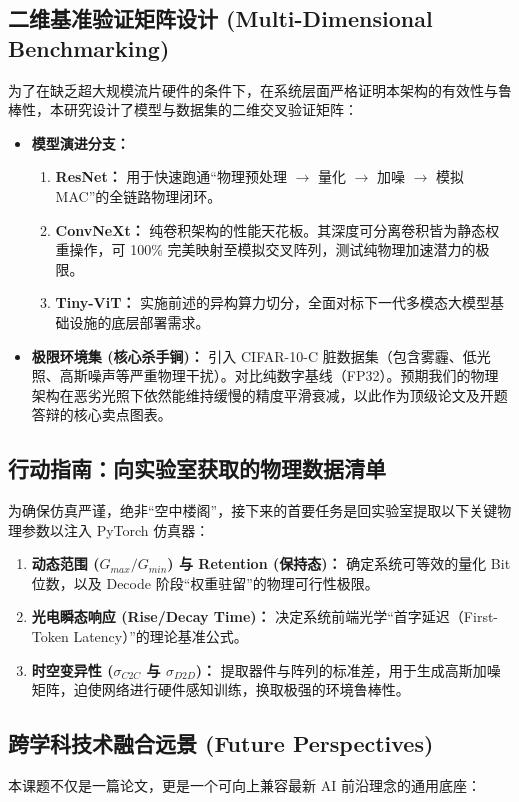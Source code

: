 \documentclass[12pt, a4paper]{ctexart}
\begin{document}
\subsection{二维基准验证矩阵设计 (Multi-Dimensional Benchmarking)}
为了在缺乏超大规模流片硬件的条件下，在系统层面严格证明本架构的有效性与鲁棒性，本研究设计了模型与数据集的二维交叉验证矩阵：

\begin{itemize}
    \item \textbf{模型演进分支：} 
    \begin{enumerate}
        \item \textbf{ResNet：} 用于快速跑通“物理预处理 $\rightarrow$ 量化 $\rightarrow$ 加噪 $\rightarrow$ 模拟 MAC”的全链路物理闭环。
        \item \textbf{ConvNeXt：} 纯卷积架构的性能天花板。其深度可分离卷积皆为静态权重操作，可 100\% 完美映射至模拟交叉阵列，测试纯物理加速潜力的极限。
        \item \textbf{Tiny-ViT：} 实施前述的异构算力切分，全面对标下一代多模态大模型基础设施的底层部署需求。
    \end{enumerate}
    \item \textbf{极限环境集 (核心杀手锏)：} 
    引入 CIFAR-10-C 脏数据集（包含雾霾、低光照、高斯噪声等严重物理干扰）。对比纯数字基线（FP32）。预期我们的物理架构在恶劣光照下依然能维持缓慢的精度平滑衰减，以此作为顶级论文及开题答辩的核心卖点图表。
\end{itemize}

\subsection{行动指南：向实验室获取的物理数据清单}
为确保仿真严谨，绝非“空中楼阁”，接下来的首要任务是回实验室提取以下关键物理参数以注入 PyTorch 仿真器：
\begin{enumerate}
    \item \textbf{动态范围 ($G_{max}/G_{min}$) 与 Retention (保持态)：} 确定系统可等效的量化 Bit 位数，以及 Decode 阶段“权重驻留”的物理可行性极限。
    \item \textbf{光电瞬态响应 (Rise/Decay Time)：} 决定系统前端光学“首字延迟（First-Token Latency）”的理论基准公式。
    \item \textbf{时空变异性 ($\sigma_{C2C}$ 与 $\sigma_{D2D}$)：} 提取器件与阵列的标准差，用于生成高斯加噪矩阵，迫使网络进行硬件感知训练，换取极强的环境鲁棒性。
\end{enumerate}

\subsection{跨学科技术融合远景 (Future Perspectives)}
本课题不仅是一篇论文，更是一个可向上兼容最新 AI 前沿理念的通用底座：
\end{document}
